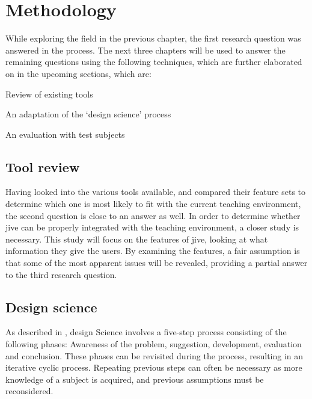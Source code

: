 \chapter{Methodology}\label{methodology}%

While exploring the field in the previous chapter, the first research question was answered in the process.
The next three chapters will be used to answer the remaining questions using the following techniques, which are further elaborated on in the upcoming sections, which are:

\begin{itemize*}
	\item{Review of existing tools}
	\item{An adaptation of the `design science' process}%
	\item{An evaluation with test subjects}
\end{itemize*}

\section{Tool review}\label{methReview}

Having looked into the various tools available, and compared their feature sets to determine which one is most likely to fit with the current teaching environment, the second question is close to an answer as well.
In order to determine whether \gls{jive} can be properly integrated with the teaching environment, a closer study is necessary.
This study will focus on the features of \gls{jive}, looking at what information they give the users.
By examining the features, a fair assumption is that some of the most apparent issues will be revealed, providing a partial answer to the third research question.

\section{Design science}\label{methDesign}

As described in \cite{Vaishnavi2004}, design Science involves a five-step process consisting of the following phases: Awareness of the problem, suggestion, development, evaluation and conclusion.
These phases can be revisited during the process, resulting in an iterative cyclic process.
Repeating previous steps can often be necessary as more knowledge of a subject is acquired, and previous assumptions must be reconsidered.

